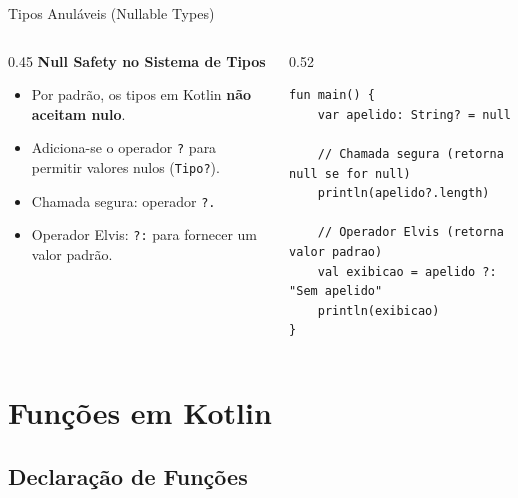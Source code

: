 \documentclass[aspectratio=169]{beamer}
\begin{document}
\begin{frame}[fragile]{Tipos Anuláveis (Nullable Types)}
  \begin{columns}[T]
    \begin{column}{0.45\textwidth}
      \textbf{Null Safety no Sistema de Tipos}
      \vspace{0.3em}
      \begin{itemize}\small
        \item Por padrão, os tipos em Kotlin \textbf{não aceitam nulo}.
        \item Adiciona-se o operador \texttt{?} para permitir valores nulos (\texttt{Tipo?}).
        \item Chamada segura: operador \texttt{?.}
        \item Operador Elvis: \texttt{?:} para fornecer um valor padrão.
      \end{itemize}
    \end{column}
    \begin{column}{0.52\textwidth}
\begin{lstlisting}[style=KotlinStyle]
fun main() {
    var apelido: String? = null
    
    // Chamada segura (retorna null se for null)
    println(apelido?.length)

    // Operador Elvis (retorna valor padrao)
    val exibicao = apelido ?: "Sem apelido"
    println(exibicao)
}
\end{lstlisting}
    \end{column}
  \end{columns}
\end{frame}

\section{Funções em Kotlin}

\subsection{Declaração de Funções}
\end{document}

